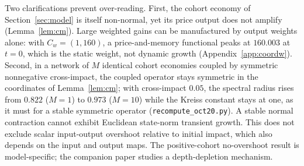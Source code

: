 Two clarifications prevent over-reading. First, the cohort economy of Section~\ref{sec:model} is itself non-normal, yet its price output does not amplify (Lemma~\ref{lem:cm}). Large weighted gains can be manufactured by output weights alone: with $C_w=(1,160)$, a price-and-memory functional peaks at $160.003$ at $t=0$, which is the static weight, not dynamic growth (Appendix~\ref{app:coordw}). Second, in a network of $M$ identical cohort economies coupled by symmetric nonnegative cross-impact, the coupled operator stays symmetric in the coordinates of Lemma~\ref{lem:cm}; with cross-impact $0.05$, the spectral radius rises from $0.822$ ($M=1$) to $0.973$ ($M=10$) while the Kreiss constant stays at one, as it must for a stable symmetric operator (\texttt{recompute\_oct20.py}). A stable normal contraction cannot exhibit Euclidean state-norm transient growth. This does not exclude scalar input-output overshoot relative to initial impact, which also depends on the input and output maps. The positive-cohort no-overshoot result is model-specific; the companion paper studies a depth-depletion mechanism.
